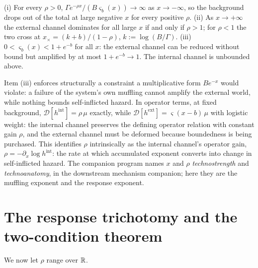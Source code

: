\begin{proposition}
\label{prop:dominance}
(i) For every $\rho>0$,
$\Gamma e^{-\rho x}/(B\varsigma_b(x))\to\infty$ as $x\to-\infty$, so
the background drops out of the total at large negative $x$ for every
positive $\rho$. (ii) As $x\to+\infty$ the external channel dominates
for all large $x$ if and only if $\rho>1$; for $\rho<1$ the two cross
at $x_\times=(k+b)/(1-\rho)$, $k:=\log(B/\Gamma)$. (iii)
$0<\varsigma_b(x)<1+e^{-b}$ for all $x$: the external channel can be
reduced without bound but amplified by at most $1+e^{-b}\to1$. The
internal channel is unbounded above.
\end{proposition}

\begin{remark}
Item (iii) enforces structurally a constraint a multiplicative form
$Be^{-x}$ would violate: a failure of the system's own muffling cannot
amplify the external world, while nothing bounds self-inflicted
hazard. In operator terms, at fixed background,
$\mathcal D[h^{\mathrm{int}}]=\rho\,\mu$ exactly, while
$\mathcal D[h^{\mathrm{ext}}]=\varsigma(x-b)\,\mu$ with logistic
weight: the internal channel preserves the defining operator relation
with constant gain $\rho$, and the external channel must be deformed
because boundedness is being purchased. This identifies $\rho$
intrinsically as the internal channel's operator gain,
$\rho=-\partial_x\log h^{\mathrm{int}}$: the rate at which accumulated
exponent converts into change in self-inflicted hazard. The companion
program names $x$ and $\rho$ \emph{technostrength} and
\emph{technoanatomy}, in the downstream mechanism companion; here they
are the muffling
exponent and the response exponent.
\end{remark}

\section{The response trichotomy and the two-condition theorem}
\label{sec:trichotomy}

We now let $\rho$ range over $\mathbb{R}$.

